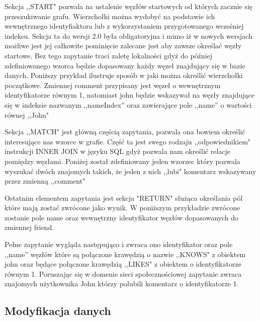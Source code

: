 \documentclass[brudnopis]{xmgr}
\begin{document}
Sekcja ,,START" pozwala na ustalenie węzłów startowych od których zacznie się przeszukiwanie grafu. Wierzchołki można wydobyć na podstawie ich wewnętrznego identyfiaktora lub z wykorzystaniem przygotowanego wcześniej indeksu. Sekcja ta do wersji 2.0 była obligatoryjna i mimo iż w nowych wersjach możliwe jest jej całkowite pominięcie zalecane jest aby zawsze określać węzły startowe. Bez tego zapytanie traci zaletę lokalności gdyż do później zdefiniowanego wzorca będzie dopasowany każdy węzeł znajdujący się w bazie danych. Poniższy przykład ilustruje sposób w jaki można określić wierzchołki początkowe. Zmiennej comment przypisany jest węzeł o wewnętrznym identyfikatorze równym 1, natomiast john będzie wskazywał na węzły znajdujące się w indeksie nazwanym ,,nameIndex'' oraz zawierające pole ,,name'' o wartości równej ,,John"



Sekcja ,,MATCH" jest główną częścią zapytania, pozwala ona bowiem określić interesujące nas wzorce w grafie. Część ta jest swego rodzaju ,,odpowiednikiem" instrukcji INNER JOIN w języku SQL gdyż pozwala nam określić relacje pomiędzy węzłami. Poniżej został zdefiniowany jeden wzorzec który pozwala wyszukać dwóch znajomych takich, że jeden z nich ,,lubi" komentarz wskazywany przez zmienną ,,comment"



Ostatnim elementem zapytania jest sekcja "RETURN" służąca określania pól które mają zostać zwrócone jako wynik. W poniższym przykładzie zwrócone zostanie pole name oraz wewnętrzny identyfikator węzłów dopasowanych do zmiennej friend.



Pełne zapytanie wygląda następująco i zwraca ono identyfikator oraz pole ,,name'' węzłów które są połączone krawędzią o nazwie ,,KNOWS" z obiektem john oraz będące połączone krawędzią ,,LIKES" z obiektem o identyfikatorze równym {1}. Poruszając się w domenie sieci społecznościowej zapytanie zwraca znajomych użytkownika John którzy polubili komentarz o identyfikatorze {1}.



\subsection{Modyfikacja danych}
\end{document}
